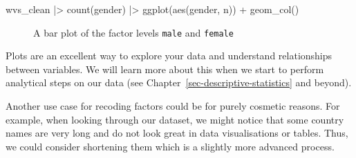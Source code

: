 \documentclass[
  letterpaper,
  DIV=11,
  numbers=noendperiod]{scrreprt}
\newenvironment{Shaded}{\begin{snugshade}}{\end{snugshade}}
\newcommand{\FunctionTok}[1]{\textcolor[rgb]{0.28,0.35,0.67}{#1}}
\newcommand{\NormalTok}[1]{\textcolor[rgb]{0.00,0.23,0.31}{#1}}
\newcommand{\SpecialCharTok}[1]{\textcolor[rgb]{0.37,0.37,0.37}{#1}}
\begin{document}
\begin{Shaded}
\begin{Highlighting}[]
\NormalTok{wvs\_clean }\SpecialCharTok{|\textgreater{}}
  \FunctionTok{count}\NormalTok{(gender) }\SpecialCharTok{|\textgreater{}}
  \FunctionTok{ggplot}\NormalTok{(}\FunctionTok{aes}\NormalTok{(gender, n)) }\SpecialCharTok{+}
  \FunctionTok{geom\_col}\NormalTok{()}
\end{Highlighting}
\end{Shaded}

\begin{figure}[H]


\caption{\label{fig-gender-bar-plot}A bar plot of the factor levels
\texttt{male} and \texttt{female}}

\end{figure}%

Plots are an excellent way to explore your data and understand
relationships between variables. We will learn more about this when we
start to perform analytical steps on our data (see
Chapter~\ref{sec-descriptive-statistics} and beyond).

Another use case for recoding factors could be for purely cosmetic
reasons. For example, when looking through our dataset, we might notice
that some country names are very long and do not look great in data
visualisations or tables. Thus, we could consider shortening them which
is a slightly more advanced process.
\end{document}
